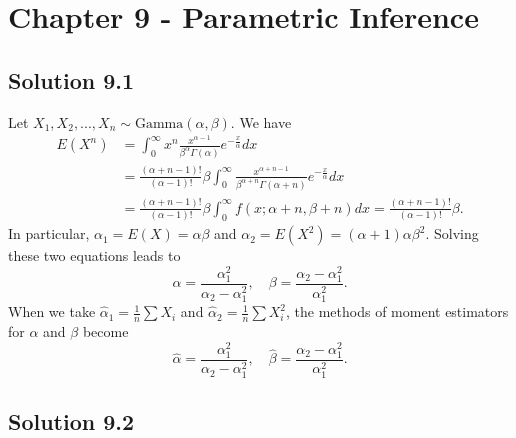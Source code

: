 \section*{Chapter 9 - Parametric Inference}

\subsection*{Solution 9.1}

Let $X_1, X_2, ..., X_n \sim \mathrm{Gamma}(\alpha, \beta)$.
We have
\begin{equation*}
    \begin{split}
        E(X^n)
            &= \int_0^{\infty} x^n \frac{x^{\alpha - 1}}{\beta^{\alpha} \Gamma(\alpha)} e^{-\frac{x}{\alpha}} dx \\
            &= \frac{(\alpha + n - 1)!}{(\alpha - 1)!} \beta \int_0^{\infty} \frac{x^{\alpha + n - 1}}{\beta^{\alpha + n} \Gamma(\alpha + n)} e^{-\frac{x}{\alpha}} dx \\
            &= \frac{(\alpha + n - 1)!}{(\alpha - 1)!} \beta \int_0^{\infty} f(x; \alpha + n, \beta + n) dx
            = \frac{(\alpha + n - 1)!}{(\alpha - 1)!} \beta.
    \end{split}
\end{equation*}
In particular, $\alpha_1 = E(X) = \alpha \beta$ and $\alpha_2 = E(X^2) = (\alpha + 1) \alpha \beta^2$.
Solving these two equations leads to
\begin{equation*}
    \alpha = \frac{\alpha_1^2}{\alpha_2 - \alpha_1^2}, \quad \beta = \frac{\alpha_2 - \alpha_1^2}{\alpha_1^2}.
\end{equation*}
When we take $\hat{\alpha}_1 = \frac{1}{n} \sum X_i$ and $\hat{\alpha}_2 = \frac{1}{n} \sum X_i^2$, the methods of moment estimators for $\alpha$ and $\beta$ become
\begin{equation*}
    \hat{\alpha} = \frac{\alpha_1^2}{\alpha_2 - \alpha_1^2}, \quad \hat{\beta} = \frac{\alpha_2 - \alpha_1^2}{\alpha_1^2}.
\end{equation*}


\subsection*{Solution 9.2}


